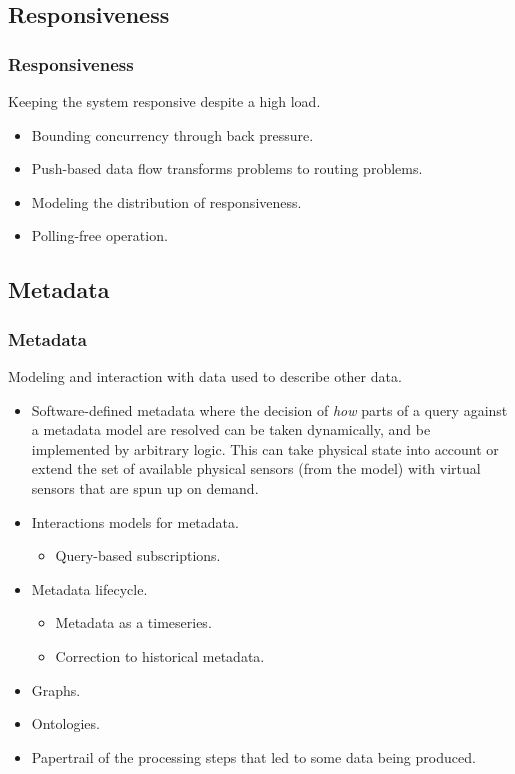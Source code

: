 \subsection{Responsiveness}
\begin{frame}
    \frametitle{Responsiveness}
    \vspace{3mm}
    Keeping the system responsive despite a high load.
    \vspace{5mm}
    \begin{itemize}
        \item Bounding concurrency through back pressure.
        \item Push-based data flow transforms problems to routing problems.
        \item Modeling the distribution of responsiveness.
        \item Polling-free operation.
    \end{itemize}
\end{frame}

\subsection{Metadata}
\begin{frame}
    \frametitle{Metadata}
    \vspace{0mm}
    Modeling and interaction with data used to describe other data.
    \vspace{2mm}
    \begin{itemize}
        \item Software-defined metadata where the decision of \textsl{how} parts of a query against a metadata model are resolved can be taken dynamically, and be implemented by arbitrary logic. This can take physical state into account or extend the set of available physical sensors (from the model) with virtual sensors that are spun up on demand.
        \item Interactions models for metadata.
          \begin{itemize}
            \item Query-based subscriptions.
          \end{itemize}
        \item Metadata lifecycle.
          \begin{itemize}
            \item Metadata as a timeseries.
            \item Correction to historical metadata.
          \end{itemize}
        \item Graphs.
        \item Ontologies.
        \item Papertrail of the processing steps that led to some data being produced.
    \end{itemize}
\end{frame}

